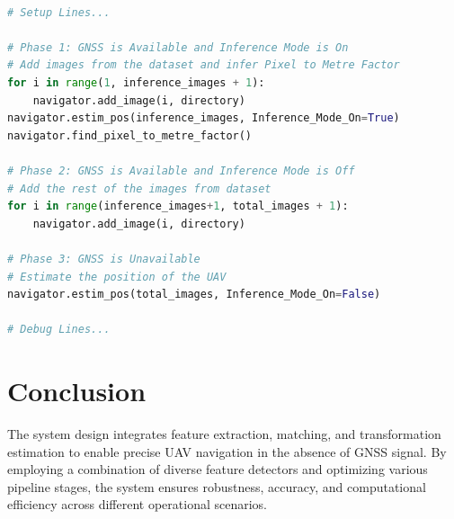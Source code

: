 \begin{lstlisting}[language=Python, basicstyle=\ttfamily, keywordstyle=\bfseries, commentstyle=\itshape\color{gray}]
    
# Setup Lines...

# Phase 1: GNSS is Available and Inference Mode is On
# Add images from the dataset and infer Pixel to Metre Factor
for i in range(1, inference_images + 1): 
    navigator.add_image(i, directory)
navigator.estim_pos(inference_images, Inference_Mode_On=True)
navigator.find_pixel_to_metre_factor()

# Phase 2: GNSS is Available and Inference Mode is Off
# Add the rest of the images from dataset
for i in range(inference_images+1, total_images + 1):
    navigator.add_image(i, directory)

# Phase 3: GNSS is Unavailable
# Estimate the position of the UAV
navigator.estim_pos(total_images, Inference_Mode_On=False)

# Debug Lines...

\end{lstlisting}



\section{Conclusion}

The system design integrates feature extraction, matching, and transformation estimation to enable precise UAV navigation in the absence of GNSS signal. By employing a combination of diverse feature detectors and optimizing various pipeline stages, the system ensures robustness, accuracy, and computational efficiency across different operational scenarios. 

